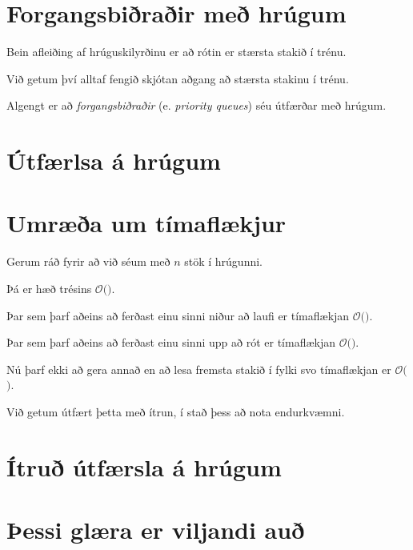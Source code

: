 \section{Forgangsbiðraðir með hrúgum}
{
	{
		\item<1-> Bein afleiðing af hrúguskilyrðinu er að rótin er stærsta stakið í trénu.
		\item<2-> Við getum því alltaf fengið skjótan aðgang að stærsta stakinu í trénu.
		\item<3-> Algengt er að \emph{forgangsbiðraðir} (e. \emph{priority queues}) séu útfærðar með hrúgum.
	}
}

\section{Útfærlsa á hrúgum}
{
}

\section{Umræða um tímaflækjur}
{
	{
		\item<1-> Gerum ráð fyrir að við séum með $n$ stök í hrúgunni.
		\item<2-> Þá er hæð trésins $\mathcal{O}($\onslide<3->{$\log n$}$)$.
		\item<4-> Þar sem  þarf aðeins að ferðast einu sinni niður að laufi er tímaflækjan $\mathcal{O}($\onslide<5->{$\log n$}$)$.
		\item<6-> Þar sem  þarf aðeins að ferðast einu sinni upp að rót er tímaflækjan $\mathcal{O}($\onslide<7->{$\log n$}$)$.
		\item<8-> Nú þarf  ekki að gera annað en að lesa fremsta stakið í fylki svo tímaflækjan er $\mathcal{O}($\onslide<9->{$\,1\,$}$)$.
		\item<10-> Við getum útfært þetta með ítrun, í stað þess að nota endurkvæmni.
	}
}

\section{Ítruð útfærsla á hrúgum}
{
}

\section{Þessi glæra er viljandi auð}
{
}


